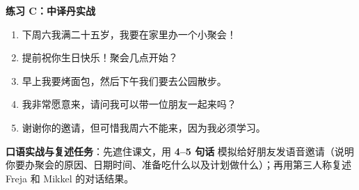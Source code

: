 \textbf{练习 C：中译丹实战}
\begin{enumerate}
  \item 下周六我满二十五岁，我要在家里办一个小聚会！
  \item 提前祝你生日快乐！聚会几点开始？
  \item 早上我要烤面包，然后下午我们要去公园散步。
  \item 我非常愿意来，请问我可以带一位朋友一起来吗？
  \item 谢谢你的邀请，但可惜我周六不能来，因为我必须学习。
\end{enumerate}


\textbf{口语实战与复述任务}：先遮住课文，用 \textbf{4--5 句话} 模拟给好朋友发语音邀请（说明你要办聚会的原因、日期时间、准备吃什么以及计划做什么）；再用第三人称复述 Freja 和 Mikkel 的对话结果。

